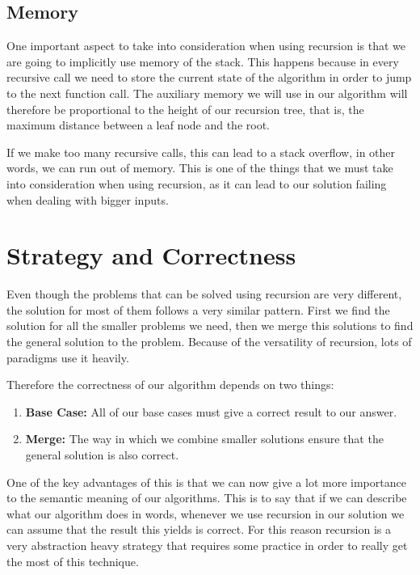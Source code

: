 \documentclass{article}
\begin{document}
\subsection{Memory}

One important aspect to take into consideration when using recursion is that we are going to implicitly use memory of the stack. This happens because in every recursive call we need to store the current state of the algorithm in order to jump to the next function call. The auxiliary memory we will use in our algorithm will therefore be proportional to the height of our recursion tree, that is, the maximum distance between a leaf node and the root.

If we make too many recursive calls, this can lead to a stack overflow, in other words, we can run out of memory. This is one of the things that we must take into consideration when using recursion, as it can lead to our solution failing when dealing with bigger inputs.

\section{Strategy and Correctness}

Even though the problems that can be solved using recursion are very different, the solution for most of them follows a very similar pattern. First we find the solution for all the smaller problems we need, then we merge this solutions to find the general solution to the problem. Because of the versatility of recursion, lots of paradigms use it heavily.

Therefore the correctness of our algorithm depends on two things:
\begin{enumerate}
	\item \textbf{Base Case:} All of our base cases must give a correct result to our answer.
	\item \textbf{Merge:} The way in which we combine smaller solutions ensure that the general solution is also correct.
\end{enumerate}

One of the key advantages of this is that we can now give a lot more importance to the semantic meaning of our algorithms. This is to say that if we can describe what our algorithm does in words, whenever we use recursion in our solution we can assume that the result this yields is correct. For this reason recursion is a very abstraction heavy strategy that requires some practice in order to really get the most of this technique.
\end{document}
